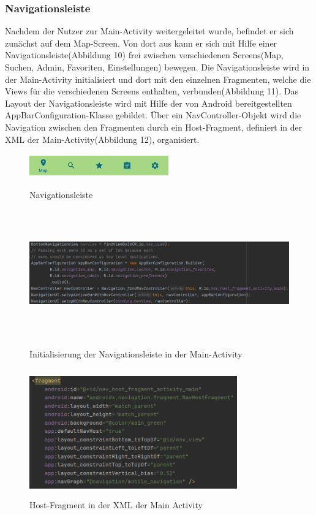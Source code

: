\documentclass[12pt, a4paper, oneside]{article}
\begin{document}
\subsubsection{Navigationsleiste}
Nachdem der Nutzer zur Main-Activity weitergeleitet wurde, befindet er sich zunächst auf dem Map-Screen. Von dort aus kann er sich mit Hilfe einer Navigationsleiste(Abbildung 10) frei zwischen verschiedenen Screens(Map, Suchen, Admin, Favoriten, Einstellungen) bewegen. Die Navigationsleiste wird in der Main-Activity initialisiert und dort mit den einzelnen Fragmenten, welche die Views für die verschiedenen Screens enthalten, verbunden(Abbildung 11). Das Layout der Navigationsleiste wird mit Hilfe der von Android bereitgestellten AppBarConfiguration-Klasse gebildet. Über ein NavController-Objekt wird die Navigation zwischen den Fragmenten durch ein Host-Fragment, definiert in der XML der Main-Activity(Abbildung 12), organisiert.
\begin{figure}
\includegraphics[width=6cm, height=1cm]{Navigationsleiste.png}
\centering
\label{navbar}
\caption{Navigationsleiste}
\end{figure}
\begin{figure}
\includegraphics[width=1\textwidth, height=5.5cm]{navbar_setup.png}
\centering
\label{nav_setup}
\caption{Initialisierung der Navigationsleiste in der Main-Activity}
\end{figure}
\begin{figure}
\includegraphics[width=0.8\textwidth, height=5.5cm]{Host-Fragment.png}
\centering
\caption{Host-Fragment in der XML der Main Activity} \label{host_fragment}
\end{figure}
\end{document}

